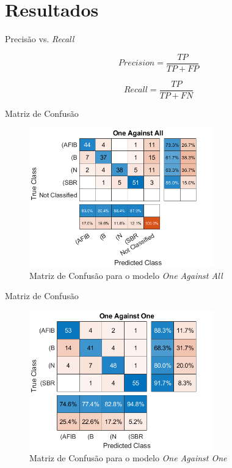 \documentclass[10pt]{beamer}
\begin{document}
\section{Resultados}

\begin{frame}{Precisão vs. \textit{Recall} }
  
    $$Precision = \frac{TP}{TP + FP}$$

    $$Recall = \frac{TP}{TP + FN}$$
  
\end{frame}

\begin{frame}{Matriz de Confusão}
  \begin{figure}[]
    \centering
    \includegraphics[width=8cm]{images/OAAConfusion.png}
    \caption{Matriz de Confusão para o modelo \textit{One Against All}}
  \end{figure}
\end{frame}

\begin{frame}{Matriz de Confusão}
  \begin{figure}[]
    \centering
    \includegraphics[width=8cm]{images/OAOConfusion.png}
    \caption{Matriz de Confusão para o modelo \textit{One Against One}}
  \end{figure}
\end{frame}
\end{document}
